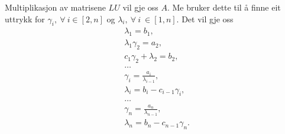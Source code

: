 \documentclass[11pt, a4paper]{article}
\begin{document}
    Multiplikasjon av matrisene $LU$ vil gje oss $A$. Me bruker dette til å finne eit uttrykk for 
    $\gamma_i, \ \forall \ i \in [2, n]$ og $\lambda_i, \ \forall \ i \ \in [1, n]$. Det vil gje oss
    \begin{equation*}
      \begin{align}
        &\lambda_1 = b_1, \\
        &\lambda_1\gamma_2 = a_2, \\
        &c_1\gamma_2 + \lambda_2 = b_2, \\
        &\dots \\
        &\gamma_i = \frac{a_{i}}{\lambda_{i-1}}, \\
        &\lambda_i = b_i - c_{i-1}\gamma_i, \\
        &\dots \\
        &\gamma_n = \frac{a_n}{\lambda_{n-1}}, \\
        &\lambda_n = b_n - c_{n-1}\gamma_n.
      \end{align}
    \end{equation*}
  
\end{document}
